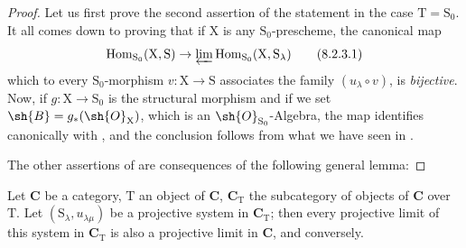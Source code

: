 \begin{proof}
Let us first prove the second assertion of the statement in the case $\mathrm{T}=\mathrm{S}_0$.
It all comes down to proving that if $\mathrm{X}$ is any $\mathrm{S}_0$-prescheme, the canonical map
\begin{equation}
  \operatorname{Hom}_{\mathrm{S}_0}(\mathrm{X},\mathrm{S})\to\varprojlim\operatorname{Hom}_{\mathrm{S}_0}(\mathrm{X},\mathrm{S}_\lambda)
  \tag{8.2.3.1}
\end{equation}
which to every $\mathrm{S}_0$-morphism $v:\mathrm{X}\to\mathrm{S}$ associates the family $(u_\lambda\circ v)$, is \emph{bijective}.
Now, if $g:\mathrm{X}\to\mathrm{S}_0$ is the structural morphism and if we set $\sh{B}=g_*(\sh{O}_\mathrm{X})$, which is an $\sh{O}_{\mathrm{S}_0}$-Algebra, the map  identifies canonically with  , and the conclusion follows from what we have seen in .

The other assertions of  are consequences of the following general lemma:
\end{proof}

\begin{lemma}[8.2.4]
\label{IV.8.2.4}
Let $\mathbf{C}$ be a category, $\mathrm{T}$ an object of $\mathbf{C}$, $\mathbf{C}_\mathrm{T}$ the subcategory of objects of $\mathbf{C}$ over $\mathrm{T}$.
Let $(\mathrm{S}_\lambda,u_{\lambda\mu})$ be a projective system in $\mathbf{C}_\mathrm{T}$; then every projective limit of this system in $\mathbf{C}_\mathrm{T}$ is also a projective limit in $\mathbf{C}$, and conversely.
\end{lemma}

